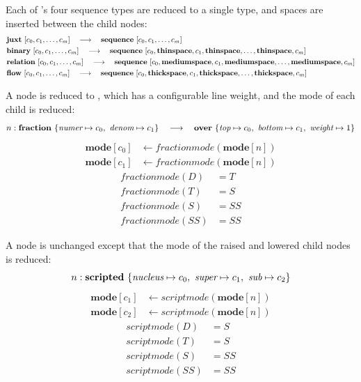 \vspace{12pt}
Each of 's four sequence types are reduced to a single type, and spaces are inserted between the child nodes:
\begin{align*}
& {\mathbf{juxt}~[  c_0, c_1, \dots, c_m  ]}
 	\quad \longrightarrow \quad
	 {\mathbf{sequence}~[  c_0, c_1, \dots, c_m  ]}
\\
& {\mathbf{binary}~[  c_0, c_1, \dots, c_m  ]}
 	\quad \longrightarrow \quad
	 {\mathbf{sequence}~[  c_0, \textbf{thinspace}, c_1, \textbf{thinspace}, \dots,\textbf{thinspace}, c_m  ]}
\\
& {\mathbf{relation}~[  c_0, c_1, \dots, c_m  ]}
 	\quad \longrightarrow \quad
	 {\mathbf{sequence}~[  c_0, \textbf{mediumspace}, c_1, \textbf{mediumspace}, \dots,\textbf{mediumspace}, c_m  ]}
\\
& {\mathbf{flow}~[  c_0, c_1, \dots, c_m  ]}
 	\quad \longrightarrow \quad
	 {\mathbf{sequence}~[  c_0, \textbf{thickspace}, c_1, \textbf{thickspace}, \dots,\textbf{thickspace}, c_m  ]}
\end{align*}


\vspace{12pt}
A  node is reduced to , which has a configurable line weight, and the mode of each child is reduced:
$$
n: {\mathbf{fraction}~\{  {\textit{numer} \mapsto c_0},~{\textit{denom} \mapsto c_1}  \}} 
 	\quad \longrightarrow \quad
	{\mathbf{over}~\{   {\textit{top} \mapsto c_0} ,~ {\textit{bottom} \mapsto c_1} ,~ {\textit{weight} \mapsto 1}   \}}
$$
\begin{align*}
\mathbf{mode}[c_0] & \leftarrow \mathit{fractionmode}(\mathbf{mode}[n])
\\
\mathbf{mode}[c_1] & \leftarrow \mathit{fractionmode}(\mathbf{mode}[n])
\end{align*}
\begin{align*}
\mathit{fractionmode}(D) & = T
\\
\mathit{fractionmode}(T) & = S
\\
\mathit{fractionmode}(S) & = SS
\\
\mathit{fractionmode}(SS) & = SS
\end{align*}

\vspace{12pt}
A  node is unchanged except that the mode of the raised and lowered child nodes is reduced:
$$
n: {\mathbf{scripted}~\{  {\textit{nucleus} \mapsto c_0},~ 
							{\textit{super} \mapsto c_1},~
							{\textit{sub} \mapsto c_2}  \}} 
$$
\begin{align*}
\mathbf{mode}[c_1] &\leftarrow \mathit{scriptmode}(\mathbf{mode}[n])
\\
\mathbf{mode}[c_2] &\leftarrow \mathit{scriptmode}(\mathbf{mode}[n])
\end{align*}
\begin{align*}
\mathit{scriptmode}(D) &= S
\\
\mathit{scriptmode}(T) &= S
\\
\mathit{scriptmode}(S) &= SS
\\
\mathit{scriptmode}(SS) &= SS
\end{align*}

